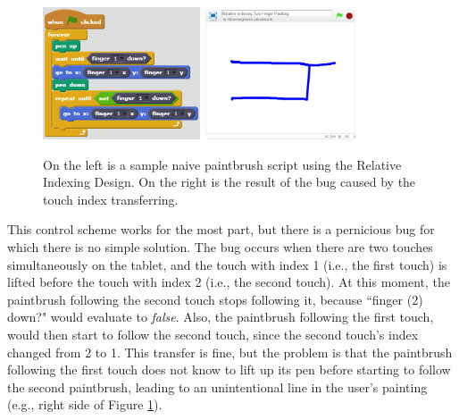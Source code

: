 \begin{figure}
\centering
\includegraphics[width=0.415\textwidth]{images/NaiveTwoFingerPaintingRID.PNG}
\includegraphics[width=0.4\textwidth]{images/IndexTransferLineBug.PNG}
\caption[Sample Naive Script for Two-Finger Painting Using the Relative Indexing Design ]{On the left is a sample naive paintbrush script using the Relative Indexing Design. On the right is the result of the bug caused by the touch index transferring.}
\label{NaiveTwoFingerPaintingRID}
\end{figure}

This control scheme works for the most part, but there is a pernicious bug for which there is no simple solution. The bug occurs when there are two touches simultaneously on the tablet, and the touch with index 1 (i.e., the first touch) is lifted before the touch with index 2 (i.e., the second touch). At this moment, the paintbrush following the second touch stops following it, because ``finger (2) down?" would evaluate to \emph{false}. Also, the paintbrush following the first touch, would then start to follow the second touch, since the second touch's index changed from 2 to 1. This transfer is fine, but the problem is that the paintbrush following the first touch does not know to lift up its pen before starting to follow the second paintbrush, leading to an unintentional line in the user's painting (e.g., right side of Figure \ref{NaiveTwoFingerPaintingRID}). 


